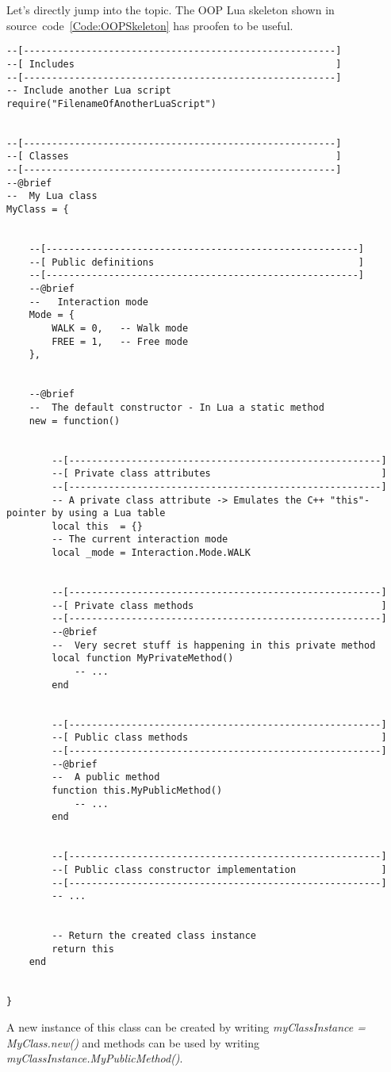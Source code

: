 Let's directly jump into the topic. The OOP Lua skeleton shown in source~code~\ref{Code:OOPSkeleton} has proofen to be useful.
\begin{lstlisting}[label=Code:OOPSkeleton,caption={Object-oriented programming (OOP) Lua skeleton}]
--[-------------------------------------------------------]
--[ Includes                                              ]
--[-------------------------------------------------------]
-- Include another Lua script
require("FilenameOfAnotherLuaScript")


--[-------------------------------------------------------]
--[ Classes                                               ]
--[-------------------------------------------------------]
--@brief
--  My Lua class
MyClass = {


	--[-------------------------------------------------------]
	--[ Public definitions                                    ]
	--[-------------------------------------------------------]
	--@brief
	--   Interaction mode
	Mode = {
		WALK = 0,	-- Walk mode
		FREE = 1,	-- Free mode
	},


	--@brief
	--  The default constructor - In Lua a static method
	new = function()


		--[-------------------------------------------------------]
		--[ Private class attributes                              ]
		--[-------------------------------------------------------]
		-- A private class attribute -> Emulates the C++ "this"-pointer by using a Lua table
		local this	= {}
		-- The current interaction mode
		local _mode	= Interaction.Mode.WALK


		--[-------------------------------------------------------]
		--[ Private class methods                                 ]
		--[-------------------------------------------------------]
		--@brief
		--  Very secret stuff is happening in this private method
		local function MyPrivateMethod()
			-- ...
		end


		--[-------------------------------------------------------]
		--[ Public class methods                                  ]
		--[-------------------------------------------------------]
		--@brief
		--  A public method
		function this.MyPublicMethod()
			-- ...
		end


		--[-------------------------------------------------------]
		--[ Public class constructor implementation               ]
		--[-------------------------------------------------------]
		-- ...


		-- Return the created class instance
		return this
	end


}
\end{lstlisting}
A new instance of this class can be created by writing \emph{myClassInstance = MyClass.new()} and methods can be used by writing \emph{myClassInstance.MyPublicMethod()}.

